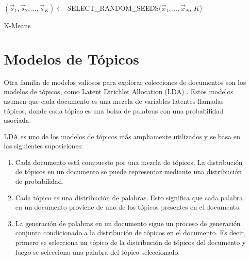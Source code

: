 \begin{algorithm}[H]
    $(\vec{s}_1, \vec{s}_2, \ldots, \vec{s}_K) \leftarrow$ SELECT\_RANDOM\_SEEDS($\vec{x}_1, \ldots, \vec{x}_N$, $K$)\;
    \;
    \caption{K-Means}\label{algo:kmeans}
\end{algorithm}

\section{Modelos de Tópicos}
Otra familia de modelos valiosos para explorar colecciones de documentos son los modelos de tópicos, como Latent Dirichlet Allocation (LDA) \cite{blei2003latent}. Estos modelos asumen que cada documento es una mezcla de variables latentes llamadas tópicos, donde cada tópico es una bolsa de palabras con una probabilidad asociada.

LDA es uno de los modelos de tópicos más ampliamente utilizados y se basa en las siguientes suposiciones:

\begin{enumerate}
 \item Cada documento está compuesto por una mezcla de tópicos. La distribución de tópicos en un documento se puede representar mediante una distribución de probabilidad.

\item Cada tópico es una distribución de palabras. Esto significa que cada palabra en un documento proviene de uno de los tópicos presentes en el documento.

\item La generación de palabras en un documento sigue un proceso de generación conjunta condicionado a la distribución de tópicos en el documento. Es decir, primero se selecciona un tópico de la distribución de tópicos del documento y luego se selecciona una palabra del tópico seleccionado.
\end{enumerate}


